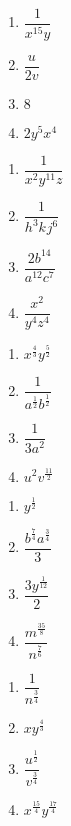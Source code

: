 \begin{multicols}{4}
\begin{enumerate}
\setcounter{enumi}{\value{HW}}

\item $\dfrac{1}{x^{15} y}$
\item $\dfrac{u}{2 v}$
\item $8$
\item $2 y^5 x^4$

\setcounter{HW}{\value{enumi}}
\end{enumerate}
\end{multicols}

\begin{multicols}{4}
\begin{enumerate}
\setcounter{enumi}{\value{HW}}

\item $\dfrac{1}{x^2 y^{11} z}$
\item $\dfrac{1}{h^3 k^{} j^6}$
\item $\dfrac{2 b^{14}}{a^{12} c^7}$
\item $\dfrac{x^2}{y^4 z^4}$

\setcounter{HW}{\value{enumi}}
\end{enumerate}
\end{multicols}

\begin{multicols}{4}
\begin{enumerate}
\setcounter{enumi}{\value{HW}}

\item $x^{\frac{4}{3}} y^{\frac{5}{2}}$
\item $\dfrac{1}{a^{\frac{1}{2}} b^{\frac{1}{2}}}$
\item $\dfrac{1}{3 a^2}$
\item $u^2 v^{\frac{11}{2}}$

\setcounter{HW}{\value{enumi}}
\end{enumerate}
\end{multicols}

\begin{multicols}{4}
\begin{enumerate}
\setcounter{enumi}{\value{HW}}

\item $y^{ \frac{1}{2} }$
\item $\dfrac{b^{\frac{7}{4}} a^{\frac{3}{4}}}{3}$
\item $\dfrac{3 y^{\frac{1}{12}}}{2}$
\item $\dfrac{m^{\frac{35}{8}}}{n^{\frac{7}{6}}}$

\setcounter{HW}{\value{enumi}}
\end{enumerate}
\end{multicols}

\begin{multicols}{4}
\begin{enumerate}
\setcounter{enumi}{\value{HW}}

\item $\dfrac{1}{n^{\frac{3}{4}}}$
\item $x y^{\frac{4}{3}}$
\item $\dfrac{u^{\frac{1}{2}}}{v^{\frac{3}{4}}}$
\item $x^{\frac{15}{4}} y^{\frac{17}{4}}$

\setcounter{HW}{\value{enumi}}
\end{enumerate}
\end{multicols}


